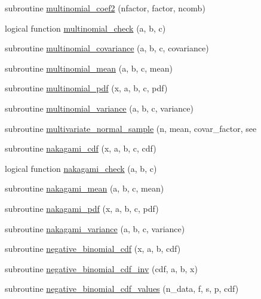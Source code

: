 \begin{DoxyCompactItemize}
subroutine \hyperlink{_bhabha__fortran__sem__doxy_8f_af3777109b98aa6fc4f03f4addf3aa25a}{multinomial\+\_\+coef2} (nfactor, factor, ncomb)
\item 
logical function \hyperlink{_bhabha__fortran__sem__doxy_8f_a08d328387eca875e6e4607272e11686d}{multinomial\+\_\+check} (a, b, c)
\item 
subroutine \hyperlink{_bhabha__fortran__sem__doxy_8f_a2b11f65f62b24b99045c300950f4339f}{multinomial\+\_\+covariance} (a, b, c, covariance)
\item 
subroutine \hyperlink{_bhabha__fortran__sem__doxy_8f_a57b18d442553cc6c6246577d0d12c251}{multinomial\+\_\+mean} (a, b, c, mean)
\item 
subroutine \hyperlink{_bhabha__fortran__sem__doxy_8f_ac791e27becddd5cfe53d1062d309de3e}{multinomial\+\_\+pdf} (x, a, b, c, pdf)
\item 
subroutine \hyperlink{_bhabha__fortran__sem__doxy_8f_ac6f2948192704b125520724b222c4b17}{multinomial\+\_\+variance} (a, b, c, variance)
\item 
subroutine \hyperlink{_bhabha__fortran__sem__doxy_8f_a43438adca45037973084c5532ff74f9c}{multivariate\+\_\+normal\+\_\+sample} (n, mean, covar\+\_\+factor, see
\item 
subroutine \hyperlink{_bhabha__fortran__sem__doxy_8f_a7d1c9c829d46e6a08ac16ecdcd892ba2}{nakagami\+\_\+cdf} (x, a, b, c, cdf)
\item 
logical function \hyperlink{_bhabha__fortran__sem__doxy_8f_a0fc1a001333a912cdbb380678a85684f}{nakagami\+\_\+check} (a, b, c)
\item 
subroutine \hyperlink{_bhabha__fortran__sem__doxy_8f_af6cbe23e0a51a71de05f4203757b4191}{nakagami\+\_\+mean} (a, b, c, mean)
\item 
subroutine \hyperlink{_bhabha__fortran__sem__doxy_8f_ac2b735b8833a1f49afea86005e5195a8}{nakagami\+\_\+pdf} (x, a, b, c, pdf)
\item 
subroutine \hyperlink{_bhabha__fortran__sem__doxy_8f_a3aa3d66f708fc79f64059739e68629c5}{nakagami\+\_\+variance} (a, b, c, variance)
\item 
subroutine \hyperlink{_bhabha__fortran__sem__doxy_8f_ad671c9a9b8c8f32ec2e8127553c61871}{negative\+\_\+binomial\+\_\+cdf} (x, a, b, cdf)
\item 
subroutine \hyperlink{_bhabha__fortran__sem__doxy_8f_ae12eccbe6c772587d80a92ff74f1d15e}{negative\+\_\+binomial\+\_\+cdf\+\_\+inv} (cdf, a, b, x)
\item 
subroutine \hyperlink{_bhabha__fortran__sem__doxy_8f_ae188cd5921ebcfa4e2b83130bba6f0e7}{negative\+\_\+binomial\+\_\+cdf\+\_\+values} (n\+\_\+data, f, s, p, cdf)

\end{DoxyCompactItemize}
